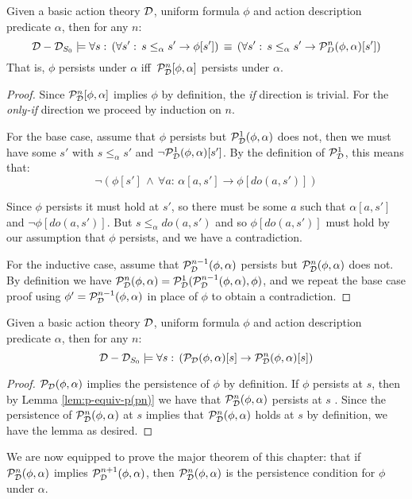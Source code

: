 \begin{lemma}
Given a basic action theory $\mathcal{D}$, uniform formula $\phi$ and action
description predicate $\alpha$, then for any $n$:\label{lem:p-equiv-p(pn)}\[
\mathcal{D}-\mathcal{D}_{S_{0}}\models\forall s:\,\left(\forall s':\, s\leq_{\alpha}s'\rightarrow\phi[s']\right)\,\equiv\,\left(\forall s':\, s\leq_{\alpha}s'\rightarrow\mathcal{P}_{D}^{n}(\phi,\alpha)[s']\right)\]
 That is, $\phi$ persists under $\alpha$ iff $\,\mathcal{P}_{\mathcal{D}}^{n}[\phi,\alpha]$
persists under $\alpha$. 
\end{lemma}
\begin{proof}
Since $\mathcal{P}_{\mathcal{D}}^{n}[\phi,\alpha]$ implies $\phi$ by definition,
the \emph{if} direction is trivial. For the \emph{only-if} direction
we proceed by induction on $n$.

For the base case, assume that $\phi$ persists but $\mathcal{P}_{\mathcal{D}}^{1}(\phi,\alpha)$
does not, then we must have some $s'$ with $s\leq_{\alpha}s'$ and
$\neg\mathcal{P}_{\mathcal{D}}^{1}(\phi,\alpha)[s']$. By the definition of $\mathcal{P}_{\mathcal{D}}^{1}$,
this means that:\[
\neg\left(\phi[s']\,\wedge\,\forall a:\,\alpha[a,s']\rightarrow\phi[do(a,s')]\right)\]


Since $\phi$ persists it must hold at $s'$, so there must be some
$a$ such that $\alpha[a,s']$ and $\neg\phi[do(a,s')]$. But $s\leq_{\alpha}do(a,s')$
and so $\phi[do(a,s')]$ must hold by our assumption that $\phi$
persists, and we have a contradiction.

For the inductive case, assume that $\mathcal{P}_{\mathcal{D}}^{n-1}(\phi,\alpha)$
persists but $\mathcal{P}_{\mathcal{D}}^{n}(\phi,\alpha)$ does not. By definition
we have $\mathcal{P}_{\mathcal{D}}^{n}(\phi,\alpha)=\mathcal{P}_{\mathcal{D}}^{1}(\mathcal{P}_{\mathcal{D}}^{n-1}(\phi,\alpha),\phi)$,
and we repeat the base case proof using $\phi'=\mathcal{P}_{\mathcal{D}}^{n-1}(\phi,\alpha)$
in place of $\phi$ to obtain a contradiction. 
\end{proof}
\begin{lemma}
Given a basic action theory $\mathcal{D}$, uniform formula $\phi$ and action
description predicate $\alpha$, then for any $n$:\label{lem:p-implies-pn}\[
\mathcal{D}-\mathcal{D}_{S_{0}}\models\forall s:\,\left(\mathcal{P}_{\mathcal{D}}(\phi,\alpha)[s]\rightarrow\mathcal{P}_{\mathcal{D}}^{n}(\phi,\alpha)[s]\right)\]

\end{lemma}
\begin{proof}
$\mathcal{P}_{\mathcal{D}}(\phi,\alpha)$ implies the persistence of $\phi$ by definition.
If $\phi$ persists at $s$, then by Lemma \ref{lem:p-equiv-p(pn)}
we have that $\mathcal{P}_{\mathcal{D}}^{n}(\phi,\alpha)$ persists at $s$ . Since
the persistence of $\mathcal{P}_{\mathcal{D}}^{n}(\phi,\alpha)$ at $s$ implies
that $\mathcal{P}_{\mathcal{D}}^{n}(\phi,\alpha)$ holds at $s$ by definition, we
have the lemma as desired. 
\end{proof}
We are now equipped to prove the major theorem of this chapter: that
if $\mathcal{P}_{\mathcal{D}}^{n}(\phi,\alpha)$ implies $\mathcal{P}_{\mathcal{D}}^{n+1}(\phi,\alpha)$,
then $\mathcal{P}_{\mathcal{D}}^{n}(\phi,\alpha)$ is the persistence condition for
$\phi$ under $\alpha$.

